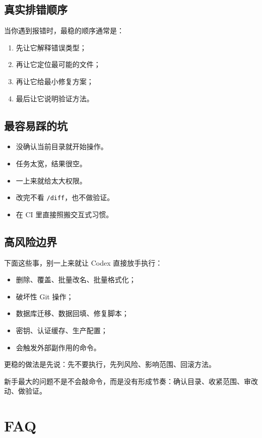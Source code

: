 \documentclass[UTF8,a4paper,11pt]{ctexart}
\begin{document}
\subsection{真实排错顺序}

当你遇到报错时，最稳的顺序通常是：
\begin{enumerate}
  \item 先让它解释错误类型；
  \item 再让它定位最可能的文件；
  \item 再让它给最小修复方案；
  \item 最后让它说明验证方法。
\end{enumerate}

\subsection{最容易踩的坑}

\begin{itemize}
  \item 没确认当前目录就开始操作。
  \item 任务太宽，结果很空。
  \item 一上来就给太大权限。
  \item 改完不看 \texttt{/diff}，也不做验证。
  \item 在 CI 里直接照搬交互式习惯。
\end{itemize}

\subsection{高风险边界}

下面这些事，别一上来就让 Codex 直接放手执行：
\begin{itemize}
  \item 删除、覆盖、批量改名、批量格式化；
  \item 破坏性 Git 操作；
  \item 数据库迁移、数据回填、修复脚本；
  \item 密钥、认证缓存、生产配置；
  \item 会触发外部副作用的命令。
\end{itemize}

更稳的做法是先说：先不要执行，先列风险、影响范围、回滚方法。

\begin{sumbox}
新手最大的问题不是不会敲命令，而是没有形成节奏：确认目录、收紧范围、审改动、做验证。
\end{sumbox}

\section{FAQ}
\end{document}
